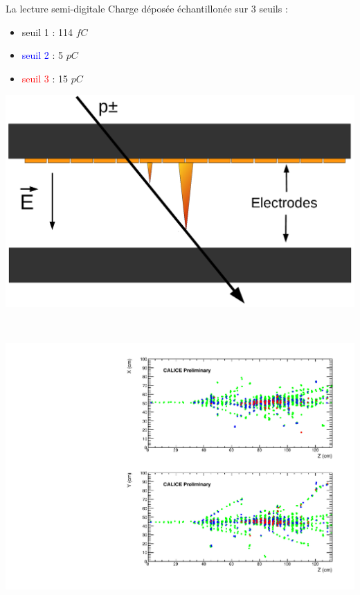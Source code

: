 \documentclass[8pt]{beamer}
\begin{document}
  \begin{frame}
  \frametitle{\secname}
  \framesubtitle{\subsecname}
    \begin{minipage}{0.52\linewidth}
      \begin{block}{La lecture semi-digitale}
        Charge déposée échantillonée sur 3 seuils :
        \begin{itemize}
          \item \textcolor{MyGreen}{seuil 1} : 114 $fC$
          \item \textcolor{blue}{seuil 2} : 5 $pC$
          \item \textcolor{red}{seuil 3} : 15 $pC$
        \end{itemize}
      \end{block}
      \begin{center}
        \includegraphics[width=\linewidth]{figs/RpcAvalanche.pdf}
      \end{center}
    \end{minipage} ~\hfill
    \begin{minipage}{0.45\linewidth}
      \begin{center}
        \includegraphics[width=\linewidth]{figs/sdhcal_pion_80GeV.pdf} \\
        ~ \\
      \end{center}
    \end{minipage}
  \end{frame}
\end{document}
